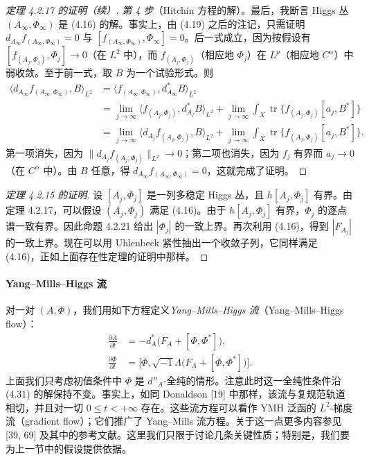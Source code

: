 \begin{proof}[定理 4.2.17 的证明（续）]
\emph{第 4 步}（Hitchin 方程的解）。最后，我断言 Higgs 丛 $(A_\infty,\Phi_\infty)$ 是 (4.16) 的解。事实上，由 (4.19) 之后的注记，只需证明 $d_{A_\infty}f_{(A_\infty,\Phi_\infty)}=0$ 与 $[f_{(A_\infty,\Phi_\infty)},\Phi_\infty]=0$。后一式成立，因为按假设有 $[f_{(A_j,\Phi_j)},\Phi_j]\to0$（在 $L^2$ 中），而 $f_{(A_j,\Phi_j)}$（相应地 $\Phi_j$）在 $L^p$（相应地 $C^\alpha$）中弱收敛。至于前一式，取 $B$ 为一个试验形式。则
\[
\begin{aligned}
\bigl\langle d_{A_\infty}f_{(A_\infty,\Phi_\infty)},B\bigr\rangle_{L^2}
&=\bigl\langle f_{(A_\infty,\Phi_\infty)},d^*_{A_\infty}B\bigr\rangle_{L^2}\\
&=\lim_{j\to\infty}\bigl\langle f_{(A_j,\Phi_j)},d^*_{A_j}B\bigr\rangle_{L^2}
+\lim_{j\to\infty}\int_X\operatorname{tr}\bigl\{f_{(A_j,\Phi_j)}[a_j,B^*]\bigr\}\\
&=\lim_{j\to\infty}\bigl\langle d_{A_j}f_{(A_j,\Phi_j)},B\bigr\rangle_{L^2}
+\lim_{j\to\infty}\int_X\operatorname{tr}\bigl\{f_{(A_j,\Phi_j)}[a_j,B^*]\bigr\}.
\end{aligned}
\]
第一项消失，因为 $\|d_{A_j}f_{(A_j,\Phi_j)}\|_{L^2}\to0$；第二项也消失，因为 $f_j$ 有界而 $a_j\to0$（在 $C^\alpha$ 中）。由 $B$ 任意，得 $d_{A_\infty}f_{(A_\infty,\Phi_\infty)}=0$，这就完成了证明。
\end{proof}

\begin{proof}[定理 4.2.15 的证明]
设 $[A_j,\Phi_j]$ 是一列多稳定 Higgs 丛，且 $h[A_j,\Phi_j]$ 有界。由定理 4.2.17，可以假设 $(A_j,\Phi_j)$ 满足 (4.16)。由于 $h[A_j,\Phi_j]$ 有界，$\Phi_j$ 的逐点谱一致有界。因此命题 4.2.21 给出 $|\Phi_j|$ 的一致上界。再次利用 (4.16)，得到 $|F_{A_j}|$ 的一致上界。现在可以用 Uhlenbeck 紧性抽出一个收敛子列，它同样满足 (4.16)，正如上面存在性定理的证明中那样。
\end{proof}

\paragraph{Yang--Mills--Higgs 流}
对一对 $(A,\Phi)$，我们用如下方程定义\emph{Yang--Mills--Higgs 流}（Yang--Mills--Higgs flow）：
\begin{equation}
\begin{aligned}
\frac{\partial A}{\partial t}&=-d_A^*\bigl(F_A+[\Phi,\Phi^*]\bigr),\\
\frac{\partial\Phi}{\partial t}&=\bigl[\Phi,\sqrt{-1}\Lambda\bigl(F_A+[\Phi,\Phi^*]\bigr)\bigr].
\end{aligned}
\label{eq:4.31}\tag{4.31}
\end{equation}
上面我们只考虑初值条件中 $\Phi$ 是 $d''_A$-全纯的情形。注意此时这一全纯性条件沿 (4.31) 的解保持不变。事实上，如同 Donaldson [19] 中那样，该流与复规范轨道相切，并且对一切 $0\le t<+\infty$ 存在。这些流方程可以看作 YMH 泛函的 $L^2$-梯度流（gradient flow）；它们推广了 Yang--Mills 流方程。关于这一点更多内容参见 [39, 69] 及其中的参考文献。这里我们只限于讨论几条关键性质；特别是，我们要为上一节中的假设提供依据。

